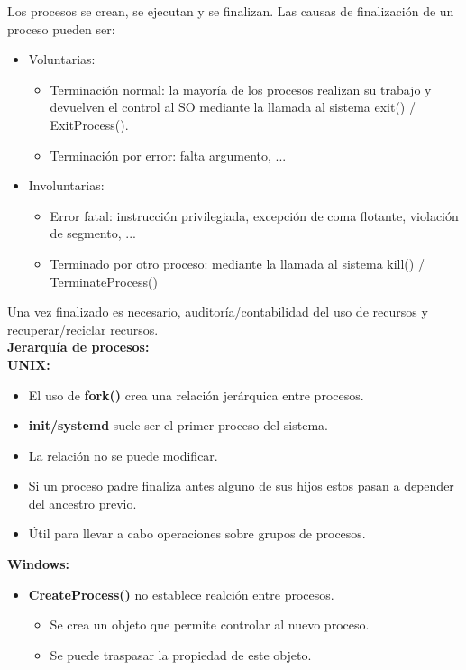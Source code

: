 \documentclass{article}
\begin{document}
Los procesos se crean, se ejecutan y se finalizan. Las causas de finalización de un proceso pueden ser:
\begin{itemize}
\item Voluntarias:
	\begin{itemize}
	\item Terminación normal: la mayoría de los procesos realizan su trabajo y devuelven el control al SO mediante la llamada al sistema exit() / ExitProcess().
	
	\item Terminación por error: falta argumento, ...
	\end{itemize}

\item Involuntarias:
	\begin{itemize}
	\item Error fatal: instrucción privilegiada, excepción de coma flotante, violación de segmento, ...
	
	\item Terminado por otro proceso: mediante la llamada al sistema kill() / TerminateProcess()
	\end{itemize}
\end{itemize}

Una vez finalizado es necesario, auditoría/contabilidad del uso de recursos y recuperar/reciclar recursos. \\

\textbf{Jerarquía de procesos:}\\

\textbf{UNIX:}
\begin{itemize}
\item El uso de \textbf{fork()} crea una relación jerárquica entre procesos.

\item \textbf{init/systemd} suele ser el primer proceso del sistema.

\item La relación no se puede modificar.

\item Si un proceso padre finaliza antes alguno de sus hijos estos pasan a depender del ancestro previo.

\item Útil para llevar a cabo operaciones sobre grupos de procesos.
\end{itemize}

\textbf{Windows:}
\begin{itemize}
\item \textbf{CreateProcess()} no establece realción entre procesos.
	\begin{itemize}
	\item Se crea un objeto que permite controlar al nuevo proceso.
	
	\item Se puede traspasar la propiedad de este objeto.
	\end{itemize}
\end{itemize}
\end{document}
